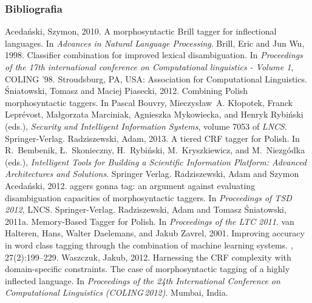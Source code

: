 \documentclass[xcolor=dvipsnames,polish]{beamer}
\begin{document}
\begin{frame}[allowframebreaks]
  \frametitle{Bibliografia}
  \begin{thebibliography}{10}
  \beamertemplatebookbibitems
Acedański, Szymon, 2010.
\newblock A morphosyntactic {B}rill tagger for inflectional languages.
\newblock In {\em Advances in Natural Language Processing\/}.
  \beamertemplatearticlebibitems
Brill, Eric and Jun Wu, 1998.
\newblock Classifier combination for improved lexical disambiguation.
\newblock In {\em Proceedings of the 17th international conference on
  Computational linguistics - Volume 1\/}, COLING '98. Stroudsburg, PA, USA:
  Association for Computational Linguistics.
  \beamertemplatearticlebibitems
Śniatowski, Tomasz and Maciej Piasecki, 2012.
\newblock Combining {P}olish morphosyntactic taggers.
\newblock In Pascal Bouvry, Mieczysław~A. Kłopotek, Franck Leprévost,
  Małgorzata Marciniak, Agnieszka Mykowiecka, and Henryk Rybiński (eds.),
  {\em Security and Intelligent Information Systems\/}, volume 7053 of {\em
  LNCS\/}. Springer-Verlag.
  \beamertemplatearticlebibitems
Radziszewski, Adam, 2013.
\newblock A tiered {CRF} tagger for {P}olish.
\newblock In R.~Bembenik, {\L}.~Skonieczny, H.~Rybi\'{n}ski, M.~Kryszkiewicz,
  and M.~Niezg{\'o}dka (eds.), {\em Intelligent Tools for Building a Scientific
  Information Platform: Advanced Architectures and Solutions\/}. Springer
  Verlag.
  \beamertemplatearticlebibitems
Radziszewski, Adam and Szymon Acedański, 2012.
aggers gonna tag: an argument against evaluating disambiguation
  capacities of morphosyntactic taggers.
\newblock In {\em Proceedings of TSD 2012\/}, LNCS. Springer-Verlag.
\beamertemplatearticlebibitems
{}
Radziszewski, Adam and Tomasz Śniatowski, 2011a.
 {M}emory-{B}ased {T}agger for {P}olish.
\newblock In {\em Proceedings of the LTC 2011\/}.
\beamertemplatearticlebibitems
{}
van Halteren, Hans, Walter Daelemans, and Jakub Zavrel, 2001.
\newblock Improving accuracy in word class tagging through the combination of
  machine learning systems.
, 27(2):199--229.
\beamertemplatearticlebibitems
{}
Waszczuk, Jakub, 2012.
\newblock Harnessing the {CRF} complexity with domain-specific constraints.
  {T}he case of morphosyntactic tagging of a highly inflected language.
\newblock In {\em Proceedings of the 24th International Conference on
  Computational Linguistics ({COLING}\,2012)\/}. Mumbai, India.
  \end{thebibliography}
\end{frame}
\end{document}
